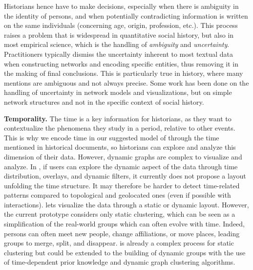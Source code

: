 Historians hence have to make decisions, especially when there is ambiguity in the identity of persons, and when potentially contradicting information is written on the same individuals (concerning age, origin, profession, etc.).
This process raises a problem that is widespread in quantitative social history, but also in most empirical science, which is the handling of \emph{ambiguity} and \emph{uncertainty}.
Practitioners typically dismiss the uncertainty inherent to most textual data when constructing networks and encoding specific entities, thus removing it in the making of final conclusions.
This is particularly true in history, where many mentions are ambiguous and not always precise\cite{dufournaudRechercheEmpiriqueHistoire2015}.
Some work has been done on the handling of uncertainty in network models\cite{adarManagingUncertaintySocial} and visualizations\cite{adarManagingUncertaintySocial, schulzProbabilisticGraphLayout2017}, but on simple network structures and not in the specific context of social history.


\noindent\textbf{Temporality.} The time is a key information for historians, as they want to contextualize the phenomena they study in a period, relative to other events.
This is why we encode time in our suggested model of \modelplural through the time mentioned in historical documents, so historians can explore and analyze this dimension of their data.
However, dynamic graphs are complex to visualize and analyze.
In \combinet, if users can explore the dynamic aspect of the data through time distribution, overlays, and dynamic filters, it currently does not propose a layout unfolding the time structure.
It may therefore be harder to detect time-related patterns compared to topological and geolocated ones (even if possible with interactions).
\pkclustering lets visualize the data through a static or dynamic layout.
However, the current prototype considers only static clustering, which can be seen as a simplification of the real-world groups which can often evolve with time\cite{rossettiCommunityDiscoveryDynamic2018}.
Indeed, persons can often meet new people, change affiliations, or move places, leading groups to merge, split, and disappear.
\pkclustering is already a complex process for static clustering but could be extended to the building of dynamic groups with the use of time-dependent prior knowledge and dynamic graph clustering algorithms.

